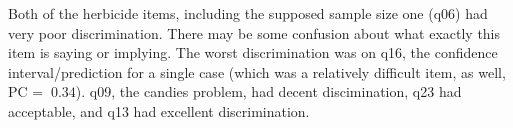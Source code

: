 \documentclass[11pt]{article}
\begin{document}
Both of the herbicide items, including the supposed sample size one (q06) had very poor discrimination.  There may be some confusion about what exactly this item is saying or implying. The worst discrimination was on q16, the confidence interval/prediction for a single case (which was a relatively difficult item, as well, PC = $~ 0.34$).  q09, the candies problem, had decent discimination, q23 had acceptable, and q13 had excellent discrimination.
\end{document}

